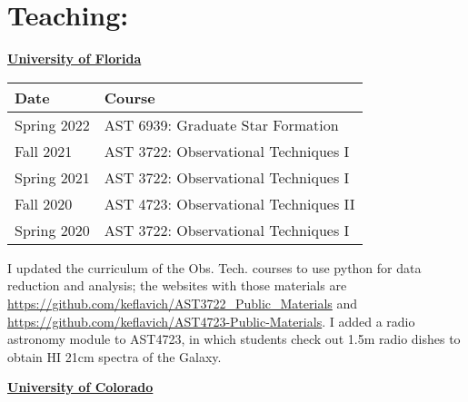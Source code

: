 \begin{minipage}{\textwidth}
\setlength{\extrarowheight}{4pt}
\section*{Teaching: }
\vspace{-6pt}

    \textbf{\underline{University of Florida}}

\begin{tabular}{ll}
    Date         & Course \\%
    \hline
     Spring 2022  &   AST 6939: Graduate Star Formation \\
     Fall 2021    &   AST 3722: Observational Techniques I  \\%
     Spring 2021  &   AST 3722: Observational Techniques I  \\%
     Fall 2020    &   AST 4723: Observational Techniques II \\%
     Spring 2020  &   AST 3722: Observational Techniques I  \\%
     \hline
\end{tabular}

I updated the curriculum of the Obs. Tech. courses to use python for data reduction and analysis; 
the websites with those materials are \url{https://github.com/keflavich/AST3722_Public_Materials}
and \url{https://github.com/keflavich/AST4723-Public-Materials}.  I added a radio astronomy module to 
AST4723, in which students check out 1.5m radio dishes to obtain HI 21cm spectra of the Galaxy.

    \vspace{12pt}
\textbf{\underline{University of Colorado}}


\end{minipage}
